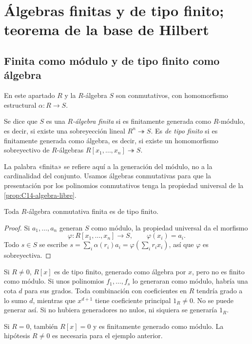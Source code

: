 \section{Álgebras finitas y de tipo finito; teorema de la base de Hilbert}\label{sec:modulos-hilbert}

\subsection{Finita como módulo y de tipo finito como álgebra}\label{tema:15-2-1}
En este apartado $R$ y la $R$-álgebra $S$ son conmutativos, con homomorfismo estructural $\alpha:R\to S$.
\begin{defi}
Se dice que $S$ es una \emph{$R$-álgebra finita} si es finitamente generada como $R$-módulo, es decir, si existe una sobreyección lineal $R^n\twoheadrightarrow S$. Es \emph{de tipo finito} si es finitamente generada como álgebra, es decir, si existe un homomorfismo sobreyectivo de $R$-álgebras $R[x_1,\ldots,x_n]\twoheadrightarrow S$.
\end{defi}
La palabra «finita» se refiere aquí a la generación del módulo, no a la cardinalidad del conjunto. Usamos álgebras conmutativas para que la presentación por los polinomios conmutativos tenga la propiedad universal de la \cref{prop:C14-algebra-libre}.

\begin{prop}
Toda $R$-álgebra conmutativa finita es de tipo finito.
\end{prop}
\begin{proof}
Si $a_1,\ldots,a_n$ generan $S$ como módulo, la propiedad universal da el morfismo
\[
\varphi:R[x_1,\ldots,x_n]\longrightarrow S,\qquad\varphi(x_i)=a_i.
\]
Todo $s\in S$ se escribe $s=\sum_i\alpha(r_i)a_i=\varphi(\sum_i r_ix_i)$, así que $\varphi$ es sobreyectiva.
\end{proof}

\begin{ejem}
Si $R\ne0$, $R[x]$ es de tipo finito, generado como álgebra por $x$, pero no es finito como módulo. Si unos polinomios $f_1,\ldots,f_s$ lo generaran como módulo, habría una cota $d$ para sus grados. Toda combinación con coeficientes en $R$ tendría grado a lo sumo $d$, mientras que $x^{d+1}$ tiene coeficiente principal $1_R\ne0$. No se puede generar así. Si no hubiera generadores no nulos, ni siquiera se generaría $1_R$.
\end{ejem}
\begin{obs}
Si $R=0$, también $R[x]=0$ y es finitamente generado como módulo. La hipótesis $R\ne0$ es necesaria para el ejemplo anterior.
\end{obs}

